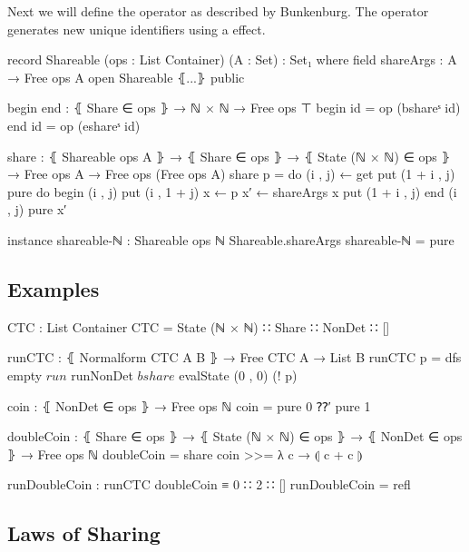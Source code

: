 Next we will define the  operator as described by
Bunkenburg.
The operator generates new unique identifiers using a 
effect.

\begin{code}
record Shareable (ops : List Container) (A : Set) : Set₁ where
  field
    shareArgs : A → Free ops A
open Shareable ⦃...⦄ public

begin end : ⦃ Share ∈ ops ⦄ → ℕ × ℕ → Free ops ⊤
begin  id = op (bshareˢ id)
end    id = op (eshareˢ id)

share : ⦃ Shareable ops A ⦄ → ⦃ Share ∈ ops ⦄ → ⦃ State (ℕ × ℕ) ∈ ops ⦄ →
  Free ops A → Free ops (Free ops A)
share p = do
  (i , j) ← get
  put (1 + i , j)
  pure do
    begin (i , j)
    put (i , 1 + j)
    x  ← p
    x′ ← shareArgs x
    put (1 + i , j)
    end (i , j)
    pure x′

instance
  shareable-ℕ : Shareable ops ℕ
  Shareable.shareArgs shareable-ℕ = pure
\end{code}

\subsection{Examples}

\begin{code}
CTC : List Container
CTC = State (ℕ × ℕ) ∷ Share ∷ NonDet ∷ []

runCTC : ⦃ Normalform CTC A B ⦄ → Free CTC A → List B
runCTC p = dfs empty $ run $ runNonDet $ bshare $ evalState (0 , 0) (! p)

coin : ⦃ NonDet ∈ ops ⦄ → Free ops ℕ
coin = pure 0 ⁇′ pure 1

doubleCoin : ⦃ Share ∈ ops ⦄ → ⦃ State (ℕ × ℕ) ∈ ops ⦄ → ⦃ NonDet ∈ ops ⦄ →
  Free ops ℕ
doubleCoin = share coin >>= λ c → ⦇ c + c ⦈

runDoubleCoin : runCTC doubleCoin ≡ 0 ∷ 2 ∷ []
runDoubleCoin = refl
\end{code}


\subsection{Laws of Sharing}

